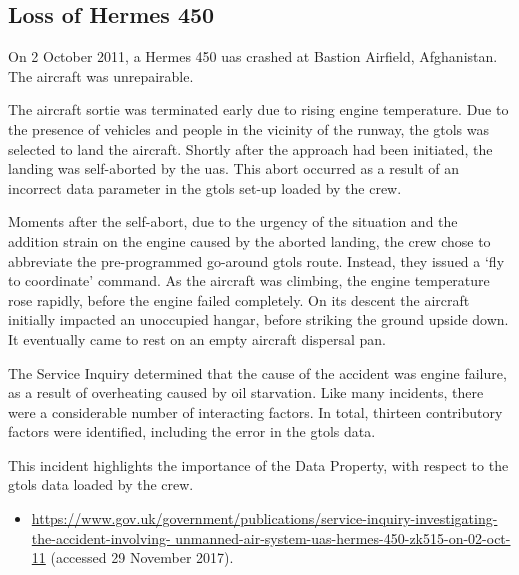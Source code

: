 \subsection{Loss of Hermes 450} \label{bkm:incacc:hermes450}
On 2 October 2011, a Hermes 450 \gls{uas} crashed at Bastion Airfield, Afghanistan. The aircraft was unrepairable.

The aircraft sortie was terminated early due to rising engine temperature. Due to the presence of vehicles and people in the vicinity of the runway, the \gls{gtols} was selected to land the aircraft. Shortly after the approach had been initiated, the landing was self-aborted by the \gls{uas}. This abort occurred as a result of an incorrect data parameter in the \gls{gtols} set-up loaded by the crew.

Moments after the self-abort, due to the urgency of the situation and the addition strain on the engine caused by the aborted landing, the crew chose to abbreviate the pre-programmed go-around \gls{gtols} route. Instead, they issued a `fly to coordinate' command. As the aircraft was climbing, the engine temperature rose rapidly, before the engine failed completely. On its descent the aircraft initially impacted an unoccupied hangar, before striking the ground upside down. It eventually came to rest on an empty aircraft dispersal pan.

The Service Inquiry determined that the cause of the accident was engine failure, as a result of overheating caused by oil starvation. Like many incidents, there were a considerable number of interacting factors. In total, thirteen contributory factors were identified, including the error in the \gls{gtols} data.

This incident highlights the importance of the  Data Property, with respect to the \gls{gtols} data loaded by the crew.

\begin{samepage}
\begin{itemize}
	\item \raggedright{\href{https://www.gov.uk/government/publications/service-inquiry-investigating-the-accident-involving-unmanned-air-system-uas-hermes-450-zk515-on-02-oct-11}{https://www.gov.uk/government/publications/service-inquiry-investigating-the-accident-involving- unmanned-air-system-uas-hermes-450-zk515-on-02-oct-11} (accessed 29 November 2017).}
\end{itemize}
\end{samepage}


